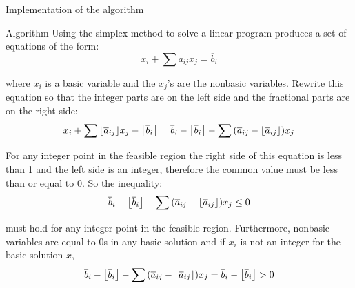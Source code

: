 \documentclass[9pt]{extarticle}
\DeclarePairedDelimiter\floor{\lfloor}{\rfloor}
\begin{document}
\begin{section}{Implementation of the algorithm}
\begin{subsection}{Algorithm}
            Using the simplex method to solve a linear program produces a set of equations of the form:
            \begin{equation*}
                x_i + \sum{\overline{a}_{ij}x_j} = \overline{b}_i
            \end{equation*}

            where $x_i$ is a basic variable and the $x_j$'s are the nonbasic variables. 
            Rewrite this equation so that the integer parts are on the left side and the fractional parts are on the right side:
            \begin{equation*}
                x_i + \sum{
                    \floor*{
                        \overline{a}_{ij}}
                    }x_j - \floor*{
                        \overline{b}_i
                     } = \overline{b}_i - \floor*{
                        \overline{b}_i
                     } - \sum{
                         (\overline{a}_{ij} - \floor*{
                            \overline{a}_{ij}
                        })x_j
                     }
            \end{equation*}

            For any integer point in the feasible region the right side of this equation is less than 1 and the left side is 
            an integer, therefore the common value must be less than or equal to 0. 
            So the inequality:
            \begin{equation*}
                \overline{b}_i - \floor*{
                        \overline{b}_i
                     } - \sum{
                         (\overline{a}_{ij} - \floor*{
                            \overline{a}_{ij}
                        })x_j
                     } \leq 0
            \end{equation*}

            must hold for any integer point in the feasible region. 
            Furthermore, nonbasic variables are equal to 0s in any basic solution and if $x_i$ is not an integer for the basic 
            solution $x$,
            \begin{equation*}
                \overline{b}_i - \floor*{
                        \overline{b}_i
                     } - \sum{
                         (\overline{a}_{ij} - \floor*{
                            \overline{a}_{ij}
                        })x_j
                     } = \overline{b}_i - \floor*{
                        \overline{b}_i
                     } > 0
            \end{equation*}


\end{subsection}
\end{section}
\end{document}

